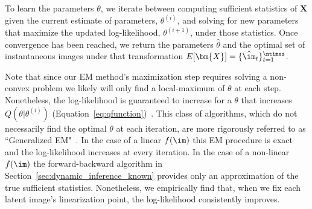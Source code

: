 	
	To learn the parameters $\theta$, we iterate between computing sufficient statistics of $\bm{X}$ given the current estimate of parameters, $\theta^{(i)}$, %
	and solving for new parameters that maximize the updated log-likelihood, $\theta^{(i+1)}$, under those statistics. 
	Once convergence has been reached, we return the parameters $\hat{\theta}$ and the optimal set of instantaneous images under that transformation $E[\bm{X}] =  \{ \hat{\im}_t \}_{t=1}^{\ntimes} $.
	
	Note that since our EM method's maximization step requires solving a non-convex problem we likely will only find a local-maximum of $\theta$ at each step. Nonetheless, the log-likelihood is guaranteed to increase for a $\theta$ that increases $Q(\theta|\theta^{(i)})$ (Equation~\ref{eq:qfunction})~\cite{little2014statistical}. This class of algorithms, which do not necessarily find the optimal $\theta$ at each iteration, are more rigorously referred to as ``Generalized EM"~\cite{little2014statistical}. In the case of a linear $f(\im)$ this EM procedure is exact and the log-likelihood increases at every iteration. In the case of a non-linear $f(\im)$ the forward-backward algorithm in Section~\ref{sec:dynamic_inference_known} provides only an approximation of the true sufficient statistics. Nonetheless, we empirically find that, when we fix each latent image's linearization point, the log-likelihood consistently improves. 
	
	
	
	
	
	
	
	




